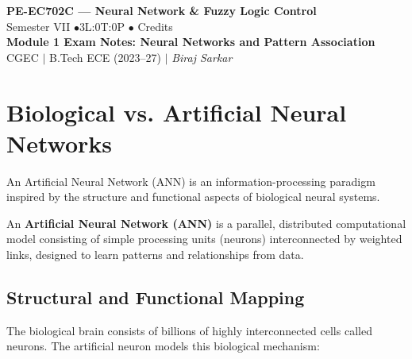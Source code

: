 \documentclass[12pt,a4paper]{article}
\begin{document}

\begin{center}
  {\LARGE\bfseries\color{myred} PE-EC702C --- Neural Network \& Fuzzy Logic Control}\\[5pt]
  {\normalsize\color{mydark} Semester VII \quad$\bullet$\quad 3L:0T:0P \quad$\bullet$ Credits}\\[3pt]
  {\normalsize\color{myteal}\textbf{Module 1 Exam Notes: Neural Networks and Pattern Association}}\\[3pt]
  {\small\color{mydark} CGEC \;$|$\; B.Tech ECE (2023--27) \;$|$\; \textit{Biraj Sarkar}}
\end{center}
\vspace{2pt}
\noindent{\color{myred}\rule{\linewidth}{1.5pt}}
\vspace{2pt}

\hypersetup{linkcolor=mydark}
\tableofcontents
\hypersetup{linkcolor=myteal}
\newpage

\section{Biological vs. Artificial Neural Networks}

An Artificial Neural Network (ANN) is an information-processing paradigm inspired by the structure and functional aspects of biological neural systems.

\begin{tcolorbox}[defbox, title={Artificial Neural Network (ANN)}]
An \textbf{Artificial Neural Network (ANN)} is a parallel, distributed computational model consisting of simple processing units (neurons) interconnected by weighted links, designed to learn patterns and relationships from data.
\end{tcolorbox}

\subsection{Structural and Functional Mapping}
The biological brain consists of billions of highly interconnected cells called neurons. The artificial neuron models this biological mechanism:
\end{document}

